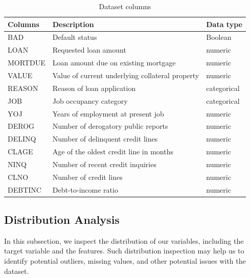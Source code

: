 \begin{table}[H]
    \small
    \setlength{\tabcolsep}{8pt}
    \renewcommand{\arraystretch}{1.3}
    \begin{center}
        \caption[Dataset columns]{Dataset columns}\label{tab:dataset}
    \begin{tabular}{@{} l p{8cm} l @{}}
    \toprule
    \textbf{Columns} & \textbf{Description} & \textbf{Data type}\\
    \midrule
    BAD & Default status & Boolean \\
    \hline
    LOAN & Requested loan amount & numeric \\
    \hline
    MORTDUE & Loan amount due on existing mortgage & numeric \\
    \hline
    VALUE & Value of current underlying collateral property & numeric \\
    \hline
    REASON & Reason of loan application & categorical \\
    \hline
    JOB & Job occupancy category & categorical \\
    \hline
    YOJ & Years of employment at present job & numeric \\
    \hline
    DEROG & Number of derogatory public reports & numeric \\
    \hline
    DELINQ & Number of delinquent credit lines & numeric \\
    \hline
    CLAGE & Age of the oldest credit line in months & numeric \\
    \hline
    NINQ & Number of recent credit inquiries & numeric \\
    \hline
    CLNO & Number of credit lines & numeric \\
    \hline
    DEBTINC & Debt-to-income ratio & numeric \\
    \bottomrule
    \end{tabular}
    \end{center}
    \begin{center} %
    \end{center}
\end{table}


\subsection{Distribution Analysis}
In this subsection, we inspect the distribution of our variables, including the target variable and the features.
Such distribution inspection may help us to identify potential outliers, missing values, and other potential issues with the dataset.

